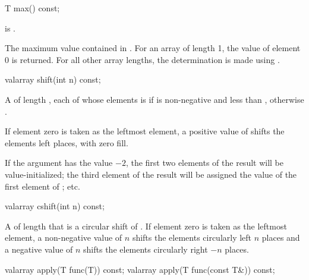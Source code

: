 %
\begin{itemdecl}
T max() const;
\end{itemdecl}

\begin{itemdescr}
\pnum
\expects
{} is .

\pnum
\returns
The maximum value contained in .
For an array of length 1, the value of element 0 is returned.
For all other array
lengths, the determination is made using
.
\end{itemdescr}

%
\begin{itemdecl}
valarray shift(int n) const;
\end{itemdecl}

\begin{itemdescr}
\pnum
\returns
A  of length , each of whose elements
 is
if 
is non-negative and less than
, otherwise .
\begin{note}
If element zero is taken as the leftmost element,
a positive value of  shifts the elements left 
places, with zero fill.
\end{note}

\pnum
\begin{example}
If the argument has the value $-2$,
the first two elements of the result will be value-initialized; the third element of the result will be assigned the value
of the first element of ; etc.
\end{example}
\end{itemdescr}

%
\begin{itemdecl}
valarray cshift(int n) const;
\end{itemdecl}

\begin{itemdescr}
\pnum
\returns
A  of length 
that is a circular shift of . If element zero is taken as
the leftmost element, a non-negative value of $n$ shifts
the elements circularly left $n$ places and a negative
value of $n$ shifts the elements circularly right $-n$ places.
\end{itemdescr}

%
\begin{itemdecl}
valarray apply(T func(T)) const;
valarray apply(T func(const T&)) const;
\end{itemdecl}

